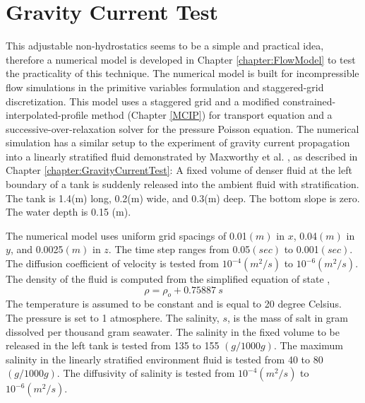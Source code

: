 \normalsize
\section{Gravity Current Test}
\label{section-ANH-Test}

This adjustable non-hydrostatics seems to be a simple and practical idea, therefore a numerical model is developed in Chapter \ref{chapter:FlowModel} to test the practicality of this technique. The numerical model is built for incompressible flow simulations in the primitive variables formulation and staggered-grid discretization. This model uses a staggered grid and a modified constrained-interpolated-profile method (Chapter \ref{MCIP}) for transport equation and a successive-over-relaxation solver for the pressure Poisson equation. The numerical simulation has a similar setup to the experiment of gravity current propagation into a linearly stratified fluid demonstrated by Maxworthy et al. \cite{Maxworthy02}, as described in Chapter \ref{chapter:GravityCurrentTest}: A fixed volume of denser fluid at the left boundary of a tank is suddenly released into the ambient fluid with stratification. The tank is 1.4(m) long, 0.2(m) wide, and 0.3(m) deep. The bottom slope is zero. The water depth is 0.15 (m).

The numerical model uses uniform grid spacings of 0.01$(m)$ in $x$, 0.04$(m)$ in $y$, and 0.0025$(m)$ in $z$. The time step ranges from 0.05$(sec)$ to 0.001$(sec)$. The diffusion coefficient of velocity is tested from $10^{-4} (m^2/s)$ to $10^{-6} (m^2/s)$. The density of the fluid is computed from the simplified equation of state \cite{Gill1982},
\begin{equation}
\rho = \rho_o +0.75887 \ s
\end{equation}
The temperature is assumed to be constant and is equal to 20 degree Celsius. The pressure is set to 1 atmosphere. The salinity, $s$, is the mass of salt in gram dissolved per thousand gram seawater. The salinity in the fixed volume to be released in the left tank is tested from 135 to 155 $(g/1000g)$. The maximum salinity in the linearly stratified environment fluid is tested from 40 to 80 $(g/1000g)$. The diffusivity of salinity is tested from $10^{-4} (m^2/s)$ to $10^{-6} (m^2/s)$.


